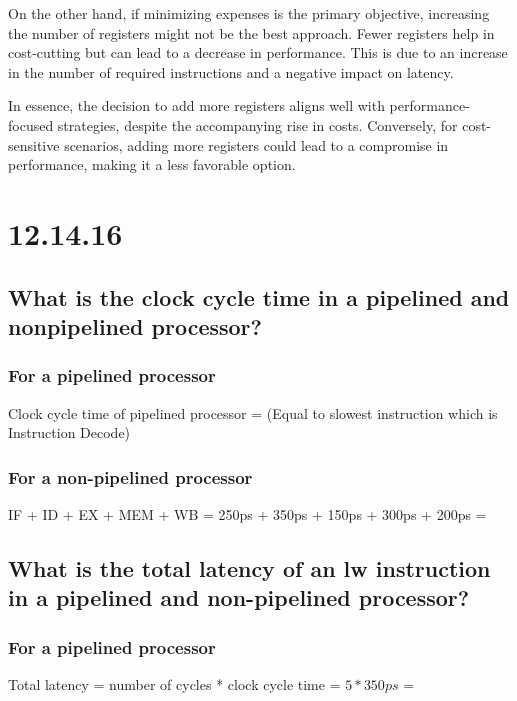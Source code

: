 \documentclass{article}
\begin{document}
On the other hand, if minimizing expenses is the primary objective, 
increasing the number of registers might not be the best approach. 
Fewer registers help in cost-cutting but can lead to a decrease in performance. 
This is due to an increase in the number of required instructions and a negative 
impact on latency.

In essence, the decision to add more registers aligns well with 
performance-focused strategies, despite the accompanying rise in 
costs. Conversely, for cost-sensitive scenarios, adding more 
registers could lead to a compromise in performance, making it a 
less favorable option.

\section{12.14.16}

\subsection{What is the clock cycle time in a pipelined and nonpipelined processor?}

\subsubsection*{For a pipelined processor}

Clock cycle time of pipelined processor =  (Equal to slowest instruction which is
Instruction Decode)

\subsubsection*{For a non-pipelined processor}

IF + ID + EX + MEM + WB = 250ps + 350ps + 150ps + 300ps + 200ps = 

\newpage

\subsection{What is the total latency of an lw instruction in a
pipelined and non-pipelined processor?}

\subsubsection*{For a pipelined processor}

Total latency = number of cycles * clock cycle time = $5 * 350ps$ = 
\end{document}
